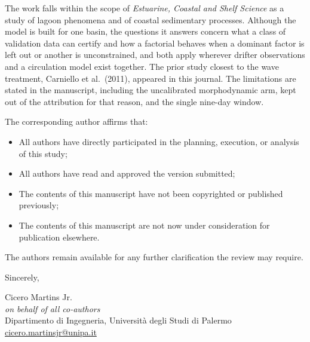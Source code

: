 \documentclass[11pt]{article}
\begin{document}
The work falls within the scope of \textit{Estuarine, Coastal and Shelf
Science} as a study of lagoon phenomena and of coastal sedimentary processes.
Although the model is built for one basin, the questions it answers concern
what a class of validation data can certify and how a factorial behaves when a
dominant factor is left out or another is unconstrained, and both apply wherever
drifter observations and a circulation model exist together. The prior study
closest to the wave treatment, Carniello et al.\ (2011), appeared in this
journal. The limitations are stated in the manuscript, including the
uncalibrated morphodynamic arm, kept out of the attribution for that reason,
and the single nine-day window.

\vspace{0.3cm}
The corresponding author affirms that:

\begin{itemize}[noitemsep, leftmargin=1.2em]
\item{All authors have directly participated in the planning, execution, or analysis of this study;}
\item{All authors have read and approved the version submitted;}
\item{The contents of this manuscript have not been copyrighted or published previously;}
\item{The contents of this manuscript are not now under consideration for publication elsewhere.}
\end{itemize}

\vspace{0.3cm}

The authors remain available for any further clarification the review may
require.

\vspace{0.5cm}
Sincerely,

\vspace{0.3cm}
Cicero Martins Jr.\\
\textit{on behalf of all co-authors}\\
Dipartimento di Ingegneria, Universit\`a degli Studi di Palermo\\
\href{mailto:cicero.martinsjr@unipa.it}{cicero.martinsjr@unipa.it}
\end{document}
